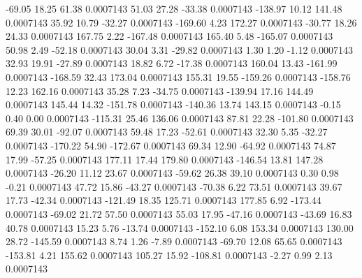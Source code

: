       -69.05       18.25       61.38     0.0007143
       51.03       27.28      -33.38     0.0007143
     -138.97       10.12      141.48     0.0007143
       35.92       10.79      -32.27     0.0007143
     -169.60        4.23      172.27     0.0007143
      -30.77       18.26       24.33     0.0007143
      167.75        2.22     -167.48     0.0007143
      165.40        5.48     -165.07     0.0007143
       50.98        2.49      -52.18     0.0007143
       30.04        3.31      -29.82     0.0007143
        1.30        1.20       -1.12     0.0007143
       32.93       19.91      -27.89     0.0007143
       18.82        6.72      -17.38     0.0007143
      160.04       13.43     -161.99     0.0007143
     -168.59       32.43      173.04     0.0007143
      155.31       19.55     -159.26     0.0007143
     -158.76       12.23      162.16     0.0007143
       35.28        7.23      -34.75     0.0007143
     -139.94       17.16      144.49     0.0007143
      145.44       14.32     -151.78     0.0007143
     -140.36       13.74      143.15     0.0007143
       -0.15        0.40        0.00     0.0007143
     -115.31       25.46      136.06     0.0007143
       87.81       22.28     -101.80     0.0007143
       69.39       30.01      -92.07     0.0007143
       59.48       17.23      -52.61     0.0007143
       32.30        5.35      -32.27     0.0007143
     -170.22       54.90     -172.67     0.0007143
       69.34       12.90      -64.92     0.0007143
       74.87       17.99      -57.25     0.0007143
      177.11       17.44      179.80     0.0007143
     -146.54       13.81      147.28     0.0007143
      -26.20       11.12       23.67     0.0007143
      -59.62       26.38       39.10     0.0007143
        0.30        0.98       -0.21     0.0007143
       47.72       15.86      -43.27     0.0007143
      -70.38        6.22       73.51     0.0007143
       39.67       17.73      -42.34     0.0007143
     -121.49       18.35      125.71     0.0007143
      177.85        6.92     -173.44     0.0007143
      -69.02       21.72       57.50     0.0007143
       55.03       17.95      -47.16     0.0007143
      -43.69       16.83       40.78     0.0007143
       15.23        5.76      -13.74     0.0007143
     -152.10        6.08      153.34     0.0007143
      130.00       28.72     -145.59     0.0007143
        8.74        1.26       -7.89     0.0007143
      -69.70       12.08       65.65     0.0007143
     -153.81        4.21      155.62     0.0007143
      105.27       15.92     -108.81     0.0007143
       -2.27        0.99        2.13     0.0007143
